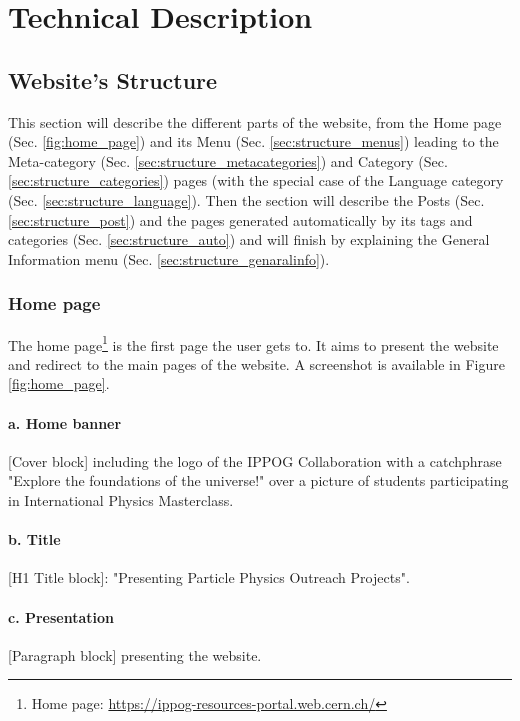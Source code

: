 \part{Technical Description}\label{part:tech}

\chapter{Website's Structure}\label{chap:structure}

This section will describe the different parts of the website, from the Home page (Sec. \ref{fig:home_page}) and its Menu (Sec. \ref{sec:structure_menus}) leading to the Meta-category (Sec. \ref{sec:structure_metacategories}) and Category (Sec. \ref{sec:structure_categories}) pages (with the special case of the Language category (Sec. \ref{sec:structure_language}). Then the section will describe the Posts (Sec. \ref{sec:structure_post}) and the pages generated automatically by its tags and categories (Sec. \ref{sec:structure_auto}) and will finish by explaining the General Information menu (Sec. \ref{sec:structure_genaralinfo}).

\section{Home page}\label{sec:structure_home_page}

The home page\footnote{Home page: \href{https://ippog-resources-portal.web.cern.ch/}{https://ippog-resources-portal.web.cern.ch/}} is the first page the user gets to. It aims to present the website and redirect to the main pages of the website. A screenshot is available in Figure \ref{fig:home_page}.

\subsection*{a. Home banner}
[Cover block] including the logo of the IPPOG Collaboration with a catchphrase "Explore the foundations of the universe!" over a picture of students participating in International Physics Masterclass.

\subsection*{b. Title}
[H1 Title block]: "Presenting Particle Physics Outreach Projects".

\subsection*{c. Presentation}
[Paragraph block] presenting the website.

